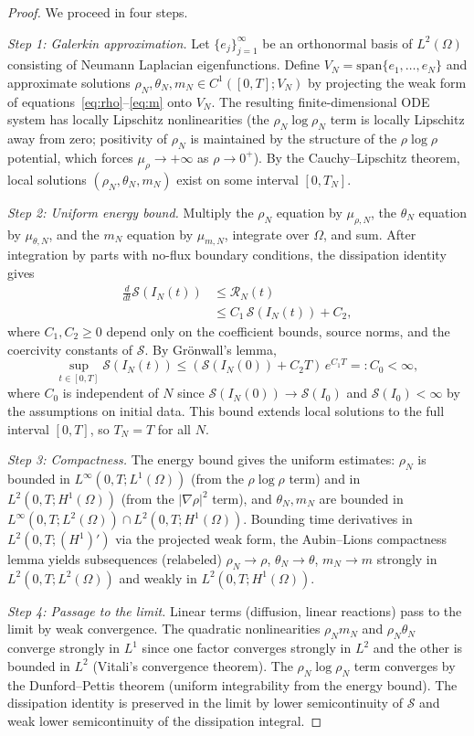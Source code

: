 \documentclass[10pt,twocolumn]{article}
\theoremstyle{plain}
\theoremstyle{definition}
\theoremstyle{remark}
\begin{document}
\begin{proof}
We proceed in four steps.

\emph{Step 1: Galerkin approximation.} Let $\{e_j\}_{j=1}^\infty$ be
an orthonormal basis of $L^2(\Omega)$ consisting of Neumann Laplacian
eigenfunctions. Define $V_N = \mathrm{span}\{e_1,\ldots,e_N\}$ and
approximate solutions $\rho_N, \theta_N, m_N \in C^1([0,T]; V_N)$ by
projecting the weak form of equations~\eqref{eq:rho}--\eqref{eq:m}
onto $V_N$. The resulting finite-dimensional ODE system has locally
Lipschitz nonlinearities (the $\rho_N \log\rho_N$ term is locally
Lipschitz away from zero; positivity of $\rho_N$ is maintained by the
structure of the $\rho\log\rho$ potential, which forces $\mu_\rho \to
+\infty$ as $\rho \to 0^+$). By the Cauchy--Lipschitz theorem, local
solutions $(\rho_N, \theta_N, m_N)$ exist on some interval
$[0, T_N]$.

\emph{Step 2: Uniform energy bound.} Multiply the $\rho_N$ equation by
$\mu_{\rho,N}$, the $\theta_N$ equation by $\mu_{\theta,N}$, and the
$m_N$ equation by $\mu_{m,N}$, integrate over $\Omega$, and sum. After
integration by parts with no-flux boundary conditions, the dissipation
identity gives
\begin{align*}
\frac{d}{dt}\mathcal{S}(I_N(t)) &\leq \mathcal{R}_N(t) \\
&\leq C_1\,\mathcal{S}(I_N(t)) + C_2,
\end{align*}
where $C_1, C_2 \geq 0$ depend only on the coefficient bounds, source
norms, and the coercivity constants of $\mathcal{S}$. By Grönwall's
lemma,
\[
\sup_{t \in [0,T]} \mathcal{S}(I_N(t)) \leq (\mathcal{S}(I_N(0)) + C_2 T)\,e^{C_1 T} =: C_0 < \infty,
\]
where $C_0$ is independent of $N$ since $\mathcal{S}(I_N(0)) \to
\mathcal{S}(I_0)$ and $\mathcal{S}(I_0) < \infty$ by the assumptions
on initial data. This bound extends local solutions to the full interval
$[0,T]$, so $T_N = T$ for all $N$.

\emph{Step 3: Compactness.} The energy bound gives the uniform estimates:
$\rho_N$ is bounded in $L^\infty(0,T;L^1(\Omega))$ (from the
$\rho\log\rho$ term) and in $L^2(0,T;H^1(\Omega))$ (from the $|\nabla\rho|^2$
term), and $\theta_N, m_N$ are bounded in $L^\infty(0,T;L^2(\Omega)) \cap
L^2(0,T;H^1(\Omega))$. Bounding time derivatives in $L^2(0,T; (H^1)')$
via the projected weak form, the Aubin--Lions compactness lemma yields
subsequences (relabeled) $\rho_N \to \rho$, $\theta_N \to \theta$,
$m_N \to m$ strongly in $L^2(0,T;L^2(\Omega))$ and weakly in
$L^2(0,T;H^1(\Omega))$.

\emph{Step 4: Passage to the limit.} Linear terms (diffusion, linear
reactions) pass to the limit by weak convergence. The quadratic
nonlinearities $\rho_N m_N$ and $\rho_N\theta_N$ converge strongly in
$L^1$ since one factor converges strongly in $L^2$ and the other is
bounded in $L^2$ (Vitali's convergence theorem). The $\rho_N\log\rho_N$
term converges by the Dunford--Pettis theorem (uniform integrability
from the energy bound). The dissipation identity is preserved in the
limit by lower semicontinuity of $\mathcal{S}$ and weak lower
semicontinuity of the dissipation integral.
\end{proof}
\end{document}
